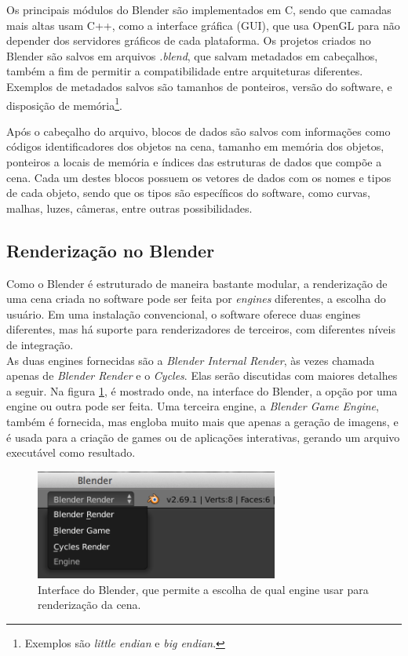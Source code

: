 \documentclass[12pt, a4paper, oneside]{book}
\begin{document}
Os principais módulos do Blender são implementados em C, sendo que camadas mais altas usam C++, como a interface gráfica (GUI), que usa OpenGL para não depender dos servidores gráficos de cada plataforma. Os projetos criados no Blender são salvos em arquivos {\it *.blend}, que salvam metadados em cabeçalhos, também a fim de permitir a compatibilidade entre arquiteturas diferentes. Exemplos de metadados salvos são tamanhos de ponteiros, versão do software, e disposição de memória\footnote{Exemplos são {\it little endian} e {\it big endian}.}.

Após o cabeçalho do arquivo, blocos de dados são salvos com informações como códigos identificadores dos objetos na cena, tamanho em memória dos objetos, ponteiros a locais de memória e índices das estruturas de dados que compõe a cena. Cada um destes blocos possuem os vetores de dados com os nomes e tipos de cada objeto, sendo que os tipos são específicos do software, como curvas, malhas, luzes, câmeras, entre outras possibilidades.  

\subsection{Renderização no Blender}

Como o Blender é estruturado de maneira bastante modular, a renderização de uma cena criada no software pode ser feita por {\it engines} diferentes, a escolha do usuário. Em uma instalação convencional, o software oferece duas engines diferentes, mas há suporte para renderizadores de terceiros, com diferentes níveis de integração. \\

As duas engines fornecidas são a {\it Blender Internal Render}, às vezes chamada apenas de {\it Blender Render} e o {\it Cycles}.
Elas serão discutidas com maiores detalhes a seguir. Na figura \ref{renderers}, é mostrado onde, na interface do Blender, a opção por uma engine ou outra pode ser feita. Uma terceira engine, a {\it Blender Game Engine}, também é fornecida, mas engloba muito mais que apenas a geração de imagens, e é usada para a criação de games ou de aplicações interativas, gerando um arquivo executável como resultado. \\

\begin{figure}[!htb]
\center
\includegraphics[width=8cm]{blender_render_option}
\caption{Interface do Blender, que permite a escolha de qual engine usar para renderização da cena.}
\label{renderers}
\end{figure}
\end{document}
